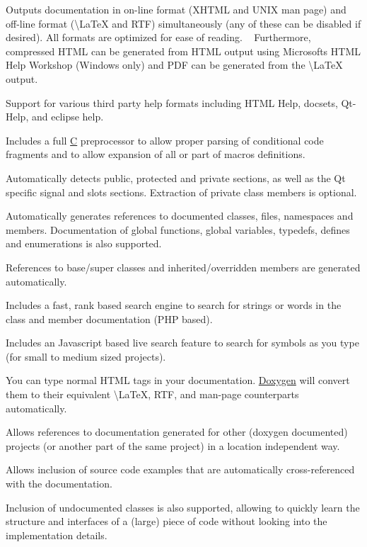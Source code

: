 \begin{DoxyItemize}
\item Outputs documentation in on-\/line format (X\+H\+T\+ML and U\+N\+IX man page) and off-\/line format (\textbackslash{}\+La\+TeX and R\+TF) simultaneously (any of these can be disabled if desired). All formats are optimized for ease of reading. ~\newline
 Furthermore, compressed H\+T\+ML can be generated from H\+T\+ML output using Microsoft\textquotesingle{}s H\+T\+ML Help Workshop (Windows only) and P\+DF can be generated from the \textbackslash{}\+La\+TeX output. 
\item Support for various third party help formats including H\+T\+ML Help, docsets, Qt-\/\+Help, and eclipse help. 
\item Includes a full \mbox{\hyperlink{class_c}{C}} preprocessor to allow proper parsing of conditional code fragments and to allow expansion of all or part of macros definitions. 
\item Automatically detects public, protected and private sections, as well as the Qt specific signal and slots sections. Extraction of private class members is optional. 
\item Automatically generates references to documented classes, files, namespaces and members. Documentation of global functions, global variables, typedefs, defines and enumerations is also supported. 
\item References to base/super classes and inherited/overridden members are generated automatically. 
\item Includes a fast, rank based search engine to search for strings or words in the class and member documentation (P\+HP based). 
\item Includes an Javascript based live search feature to search for symbols as you type (for small to medium sized projects). 
\item You can type normal H\+T\+ML tags in your documentation. \mbox{\hyperlink{class_doxygen}{Doxygen}} will convert them to their equivalent \textbackslash{}\+La\+TeX, R\+TF, and man-\/page counterparts automatically. 
\item Allows references to documentation generated for other (doxygen documented) projects (or another part of the same project) in a location independent way. 
\item Allows inclusion of source code examples that are automatically cross-\/referenced with the documentation. 
\item Inclusion of undocumented classes is also supported, allowing to quickly learn the structure and interfaces of a (large) piece of code without looking into the implementation details. 

\end{DoxyItemize}
